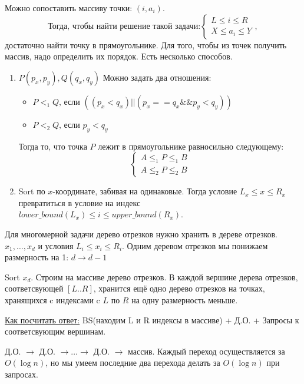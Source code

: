 \begin{center}  \end{center}
Можно сопоставить массиву точки: $(i, a_i)$. 
\begin{equation*}
	\text{Тогда, чтобы найти решение такой задачи:} 
	\begin{cases}
		L \le i \le R \\
		X \le a_i \le Y
	\end{cases}	,
\end{equation*}
достаточно найти точку в прямоугольнике. Для того, чтобы из точек получить массив, надо определить их порядок. Есть несколько способов.
\begin{enumerate}
	\item $P(p_x, p_y), Q(q_x, q_y)$
		Можно задать два отношения:
		\begin{itemize}
			\item $P <_1 Q \text{, если } ((p_x < q_x) || (p_x == q_x \&\& p_y < q_y))$
			\item $P <_2 Q \text{, если } p_y < q_y$
		\end{itemize}
		Тогда то, что точка $P$ лежит в прямоугольнике равносильно следующему:
		\begin{equation*}
			\begin{cases}
				A \le_1 P \le_1 B \\
				A \le_2 P \le_2 B
			\end{cases}
		\end{equation*}
	\item Sort по $x$-координате, забивая на одинаковые. Тогда условие $L_x \le x \le R_x$ превратиться в условие на индекс 
	$lower\_bound(L_x) \le i \le upper\_bound(R_x)$.
\end{enumerate}

Для многомерной задачи дерево отрезков нужно хранить в дереве отрезков. $x_1, \dots, x_d$ и  условия $L_i \le x_i \le R_i$. 
Одним деревом отрезков мы понижаем размерность на 1: $d \rightarrow d - 1$

Sort $x_d$. Строим на массиве дерево отрезков. В каждой вершине дерева отрезков, соответсвующей $[L..R]$, 
хранится ещё одно дерево отрезков на точках, хранящихся c индексами c $L$ по $R$ на одну размерность меньше.

\underline{Как посчитать ответ:} BS(находим L и R индексы в массиве) + Д.О. + Запросы к соответсвующим вершинам.
  
Д.О. $\rightarrow$ Д.О. $\rightarrow \dots \rightarrow$ Д.О. $\rightarrow$ массив. Каждый переход осуществляется за $O(\log n)$, но
мы умеем последние два перехода делать за $O(\log n)$ при запросах.

